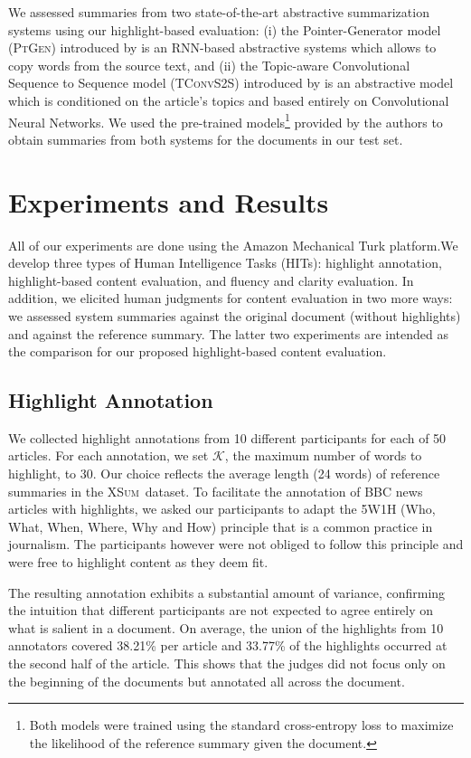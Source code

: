 \documentclass[11pt,a4paper]{article}
\newcommand\ptgen{\textsc{PtGen}}
\newcommand\tconv{\textsc{TConvS2S}}
\newcommand\xsum{\textsc{XSum}}
\begin{document}
We assessed summaries from two state-of-the-art abstractive summarization systems using our highlight-based evaluation: (i) the Pointer-Generator model (\ptgen) introduced by \citet{See2017} is an RNN-based abstractive systems which allows to copy words from the source text, and (ii) the Topic-aware Convolutional Sequence to Sequence model (\tconv) introduced by \citet{narayan18xsum} is an   abstractive model which is conditioned on the article's topics and based entirely on Convolutional Neural Networks.
We used the pre-trained models\footnote{Both models were trained using the standard cross-entropy loss to maximize the likelihood of the reference summary given the document.} provided by the authors to obtain summaries from both systems for the documents in our test set.

\section{Experiments and Results}
\label{sec:exp-res}

All of our experiments are done using the Amazon Mechanical Turk platform.We develop three types of Human Intelligence Tasks (HITs): highlight annotation, highlight-based content evaluation, and fluency and clarity evaluation. In addition, we elicited human judgments for content evaluation in two more ways: we assessed system summaries against the original document (without highlights) and against the reference summary. The latter two experiments are intended as the comparison for our proposed highlight-based content evaluation.

\subsection{Highlight Annotation} 

We collected highlight annotations from 10 different participants for each of 50 articles. For each annotation, we set  $\mathcal{K}$, the maximum number of words to highlight, to 30. Our choice reflects the average length (24 words) of reference summaries in the \xsum\ dataset. To facilitate the annotation of BBC news articles with highlights, we asked our participants to adapt the 5W1H (Who, What, When, Where, Why and How) principle \citep{Robertson1946} that is a common practice in journalism. The participants however were not obliged to follow this principle and were free to highlight content as they deem fit. 

The resulting annotation exhibits a substantial amount of variance, confirming the intuition that different participants are not expected to agree entirely on what is salient in a document. 
On average, the union of the highlights from 10 annotators covered 38.21\% per article and  33.77\% of the highlights occurred at the second half of the article. This shows that the judges did not focus only on the beginning of the documents but annotated all across the document.
\end{document}
